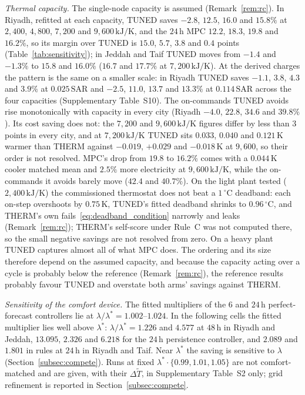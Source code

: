 \documentclass[3p,twocolumn,number]{elsarticle}
\newcommand{\SAR}{\text{SAR}}
\begin{document}
\emph{Thermal capacity.} The single-node capacity is assumed (Remark~\ref{rem:rc}). In Riyadh, refitted at each capacity, TUNED saves $-2.8$, $12.5$, $16.0$ and $15.8\%$ at $2{,}400$, $4{,}800$, $7{,}200$ and $9{,}600\,\text{kJ/K}$, and the $24\,$h MPC $12.2$, $18.3$, $19.8$ and $16.2\%$, so its margin over TUNED is $15.0$, $5.7$, $3.8$ and $0.4$ points (Table~\ref{tab:sensitivity}); in Jeddah and Taif TUNED moves from $-1.4$ and $-1.3\%$ to $15.8$ and $16.0\%$ ($16.7$ and $17.7\%$ at $7{,}200\,\text{kJ/K}$). At the derived charges the pattern is the same on a smaller scale: in Riyadh TUNED saves $-1.1$, $3.8$, $4.3$ and $3.9\%$ at $0.025\,\SAR$ and $-2.5$, $11.0$, $13.7$ and $13.3\%$ at $0.114\,\SAR$ across the four capacities (Supplementary Table~S10). The on-commands TUNED avoids rise monotonically with capacity in every city (Riyadh $-4.0$, $22.8$, $34.6$ and $39.8\%$). Its cost saving does not: the $7{,}200$ and $9{,}600\,\text{kJ/K}$ figures differ by less than $3$ points in every city, and at $7{,}200\,\text{kJ/K}$ TUNED sits $0.033$, $0.040$ and $0.121\,$K warmer than THERM against $-0.019$, $+0.029$ and $-0.018\,$K at $9{,}600$, so their order is not resolved. MPC's drop from $19.8$ to $16.2\%$ comes with a $0.044\,$K cooler matched mean and $2.5\%$ more electricity at $9{,}600\,\text{kJ/K}$, while the on-commands it avoids barely move ($42.4$ and $40.7\%$). On the light plant tested ($2{,}400\,\text{kJ/K}$) the commissioned thermostat does not beat a $1\,^\circ$C deadband: each on-step overshoots by $0.75\,$K, TUNED's fitted deadband shrinks to $0.96\,^\circ$C, and THERM's own fails~\eqref{eq:deadband_condition} narrowly and leaks (Remark~\ref{rem:rc}); THERM's self-score under Rule~C was not computed there, so the small negative savings are not resolved from zero. On a heavy plant TUNED captures almost all of what MPC does. The ordering and its size therefore depend on the assumed capacity, and because the capacity acting over a cycle is probably below the reference (Remark~\ref{rem:rc}), the reference results probably favour TUNED and overstate both arms' savings against THERM.

\emph{Sensitivity of the comfort device.} The fitted multipliers of the $6$ and $24\,$h perfect-forecast controllers lie at $\lambda/\lambda^\ast=1.002$--$1.024$. In the following cells the fitted multiplier lies well above $\lambda^\ast$: $\lambda/\lambda^\ast=1.226$ and $4.577$ at $48\,$h in Riyadh and Jeddah, $13.095$, $2.326$ and $6.218$ for the $24\,$h persistence controller, and $2.089$ and $1.801$ in rules at $24\,$h in Riyadh and Taif. Near $\lambda^\ast$ the saving is sensitive to $\lambda$ (Section~\ref{subsec:compete}). Runs at fixed $\lambda^\ast\cdot\{0.99,1.01,1.05\}$ are not comfort-matched and are given, with their $\Delta\tilde T$, in Supplementary Table~S2 only; grid refinement is reported in Section~\ref{subsec:compete}.
\end{document}
